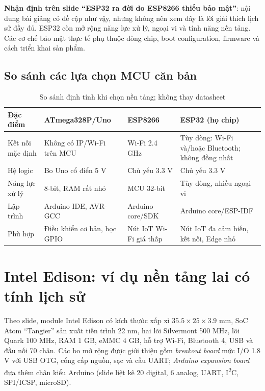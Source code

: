 \begin{notebox}
\textbf{Nhận định trên slide ``ESP32 ra đời do ESP8266 thiếu bảo mật''}: nội dung bài giảng có đề cập như vậy, nhưng không nên xem đây là lời giải thích lịch sử đầy đủ. ESP32 còn mở rộng năng lực xử lý, ngoại vi và tính năng nền tảng. Các cơ chế bảo mật thực tế phụ thuộc dòng chip, boot configuration, firmware và cách triển khai sản phẩm.
\end{notebox}

\subsection{So sánh các lựa chọn MCU căn bản}
\begin{table}[htbp]\centering\footnotesize
\caption{So sánh định tính khi chọn nền tảng; không thay datasheet}
\begin{tabularx}{\textwidth}{p{26mm}XXX}
\toprule
Đặc điểm & ATmega328P/Uno & ESP8266 & ESP32 (họ chip)\\\midrule
Kết nối mặc định & Không có IP/Wi-Fi trên MCU & Wi-Fi 2.4 GHz & Tùy dòng: Wi-Fi và/hoặc Bluetooth; không đồng nhất\\
Hệ logic & Bo Uno cổ điển 5 V & Chủ yếu 3.3 V & Chủ yếu 3.3 V\\
Năng lực xử lý & 8-bit, RAM rất nhỏ & MCU 32-bit & Tùy dòng, nhiều ngoại vi\\
Lập trình & Arduino IDE, AVR-GCC & Arduino core/SDK & Arduino core/ESP-IDF\\
Phù hợp & Điều khiển cơ bản, học GPIO & Nút IoT Wi-Fi giá thấp & Nút IoT đa cảm biến, kết nối, Edge nhỏ\\\bottomrule
\end{tabularx}
\end{table}

\section{Intel Edison: ví dụ nền tảng lai có tính lịch sử}
Theo slide, module Intel Edison có kích thước xấp xỉ $35.5\times25\times3.9$ mm, SoC Atom ``Tangier'' sản xuất tiến trình 22 nm, hai lõi Silvermont 500 MHz, lõi Quark 100 MHz, RAM 1 GB, eMMC 4 GB, hỗ trợ Wi-Fi, Bluetooth 4, USB và đầu nối 70 chân. Các bo mở rộng được giới thiệu gồm \emph{breakout board} mức I/O 1.8 V với USB OTG, cổng cấp nguồn, sạc và cầu UART; \emph{Arduino expansion board} đưa thêm chân kiểu Arduino (slide liệt kê 20 digital, 6 analog, UART, I\textsuperscript{2}C, SPI/ICSP, microSD).


